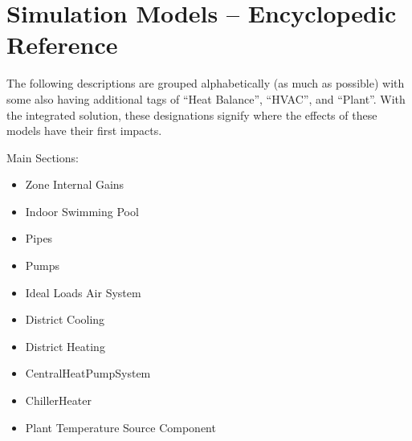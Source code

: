 \chapter{Simulation Models -- Encyclopedic Reference}\label{simulation-models---encyclopedic-reference-003}

The following descriptions are grouped alphabetically (as much as possible) with some also having additional tags of ``Heat Balance'', ``HVAC'', and ``Plant''. With the integrated solution, these designations signify where the effects of these models have their first impacts.

Main Sections:

\begin{itemize}
  \tightlist
  \item Zone Internal Gains
  \item Indoor Swimming Pool
  \item Pipes
  \item Pumps
  \item Ideal Loads Air System
  \item District Cooling
  \item District Heating
  \item CentralHeatPumpSystem
  \item ChillerHeater
  \item Plant Temperature Source Component 
\end{itemize}
